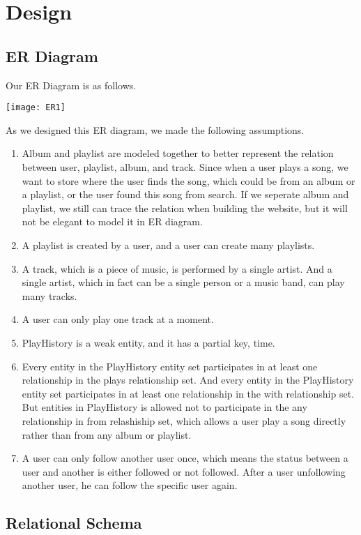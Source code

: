 \documentclass[letterpaper, 12pt]{report}
\begin{document}
	
	\chapter{Design}
	\section{ER Diagram}
	Our ER Diagram is as follows.
	\begin{center}
	\texttt{[image: ER1]}
	\end{center}
	As we designed this ER diagram, we made the following assumptions.
	\begin{enumerate}
		\item 
		Album and playlist are modeled together to better represent the relation between user, playlist, album, and track. Since when a user plays a song, we want to store where the user finds the song, which could be from an album or a playlist, or the user found this song from search. If we seperate album and playlist, we still can trace the relation when building the website, but it will not be elegant to model it in ER diagram.
		\item 
		A playlist is created by a user, and a user can create many playlists.
		\item 
		A track, which is a piece of music, is performed by a single artist. And a single artist, which in fact can be a single person or a music band, can play many tracks.
		\item 
		A user can only play one track at a moment.
		\item 
		PlayHistory is a weak entity, and it has a partial key, time.
		\item 
		Every entity in the PlayHistory entity set participates in at least one relationship in the plays relationship set. And every entity in the PlayHistory entity set participates in at least one relationship in the with relationship set. But entities in PlayHistory is allowed not to participate in the any relationship in from relashiship set, which allows a user play a song directly rather than from any album or playlist.
		\item 
		A user can only follow another user once, which means the status between a user and another is either followed or not followed. After a user unfollowing another user, he can follow the specific user again.
	\end{enumerate}
	\section{Relational Schema}
\end{document}
